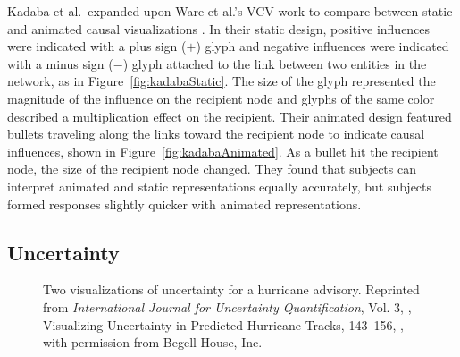 Kadaba et al.\ expanded upon Ware et al.'s VCV work to compare between static and animated causal visualizations \citeyearpar{kadaba2007}.  In their static design, positive influences were indicated with a plus sign ($+$) glyph and negative influences were indicated with a minus sign ($-$) glyph attached to the link between two entities in the network, as in Figure~\ref{fig:kadabaStatic}.  The size of the glyph represented the magnitude of the influence on the recipient node and glyphs of the same color described a multiplication effect on the recipient.   Their animated design featured bullets traveling along the links toward the recipient node to indicate causal influences, shown in Figure~\ref{fig:kadabaAnimated}.  As a bullet hit the recipient node, the size of the recipient node changed.  They found that subjects can interpret animated and static representations equally accurately, but subjects formed responses slightly quicker with animated representations.

\subsection{Uncertainty}

\begin{figure}
\centering


\caption[Two visualizations of uncertainty for a hurricane advisory]{Two visualizations of uncertainty for a hurricane advisory.  Reprinted from \textit{International Journal for Uncertainty Quantification}, Vol. 3, \citeauthor{cox2013}, Visualizing Uncertainty in Predicted Hurricane Tracks, 143--156, \textcopyright \citeyear{cox2013}, with permission from Begell House, Inc.}

	\label{fig:uncertaintyAlternatives}
\end{figure}

